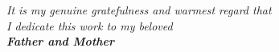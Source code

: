 \begin{center}
  \vspace*{\fill}
  \itshape{\large{It is my genuine gratefulness and warmest regard that\\
  I dedicate this work to my beloved}\\
  \Large{\bfseries{Father and Mother}}}
  \vspace*{\fill}
\end{center}
